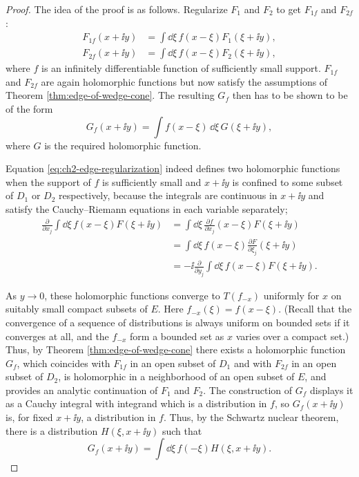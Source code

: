 \begin{proof}
The idea of the proof is as follows. Regularize $F_1$ and $F_2$ to get
$F_{1f}$ and $F_{2f}$:
\begin{equation}
  \begin{aligned}
    F_{1f}(x+\ii y)&=\int\dd\xi\,f(x-\xi)F_1(\xi+\ii y),\\
    F_{2f}(x+\ii y)&=\int\dd\xi\,f(x-\xi)F_2(\xi+\ii y),
  \end{aligned}
  \tag{2-108}\label{eq:ch2-edge-regularization}
\end{equation}
where $f$ is an infinitely differentiable function of sufficiently small
support. $F_{1f}$ and $F_{2f}$ are again holomorphic functions but now satisfy
the assumptions of Theorem \ref{thm:edge-of-wedge-cone}. The resulting $G_f$ then has to be shown to
be of the form
\[
  G_f(x+\ii y)=\int f(x-\xi)\,\dd\xi\,G(\xi+\ii y),
\]
where $G$ is the required holomorphic function.

Equation \eqref{eq:ch2-edge-regularization} indeed defines two holomorphic functions when the support of
$f$ is sufficiently small and $x+\ii y$ is confined to some subset of
$D_1$ or $D_2$ respectively, because the integrals are continuous in
$x+\ii y$ and satisfy the Cauchy--Riemann equations in each variable
separately;
\begin{equation}
  \begin{aligned}
  \frac{\partial}{\partial x_j}\int\dd\xi\,f(x-\xi)F(\xi+\ii y)
  &=\int\dd\xi\,\frac{\partial f}{\partial x_j}(x-\xi)F(\xi+\ii y)\\
  &=\int\dd\xi\,f(x-\xi)\frac{\partial F}{\partial\xi_j}(\xi+\ii y)\\
  &=-\ii\frac{\partial}{\partial y_j}
    \int\dd\xi\,f(x-\xi)F(\xi+\ii y).
  \end{aligned}
  \tag{2-109}\label{eq:ch2-edge-Cauchy-Riemann}
\end{equation}

As $y\to0$, these holomorphic functions converge to $T(f_{-x})$ uniformly
for $x$ on suitably small compact subsets of $E$. Here
$f_{-x}(\xi)=f(x-\xi)$. (Recall that the convergence of a sequence of
distributions is always uniform on bounded sets if it converges at all, and
the $f_{-x}$ form a bounded set as $x$ varies over a compact set.) Thus, by
Theorem \ref{thm:edge-of-wedge-cone} there exists a holomorphic function $G_f$, which coincides with
$F_{1f}$ in an open subset of $D_1$ and with $F_{2f}$ in an open subset of
  $D_2$, is holomorphic in a neighborhood of an open subset of $E$, and provides
  an analytic continuation of $F_1$ and $F_2$. The construction of $G_f$ displays
it as a Cauchy integral with integrand which is a distribution in $f$, so
$G_f(x+\ii y)$ is, for fixed $x+\ii y$, a distribution in $f$.
Thus, by the Schwartz nuclear theorem, there is a distribution
$H(\xi,x+\ii y)$ such that
\[
  G_f(x+\ii y)=\int\dd\xi\,f(-\xi)H(\xi,x+\ii y).
\]


\end{proof}
